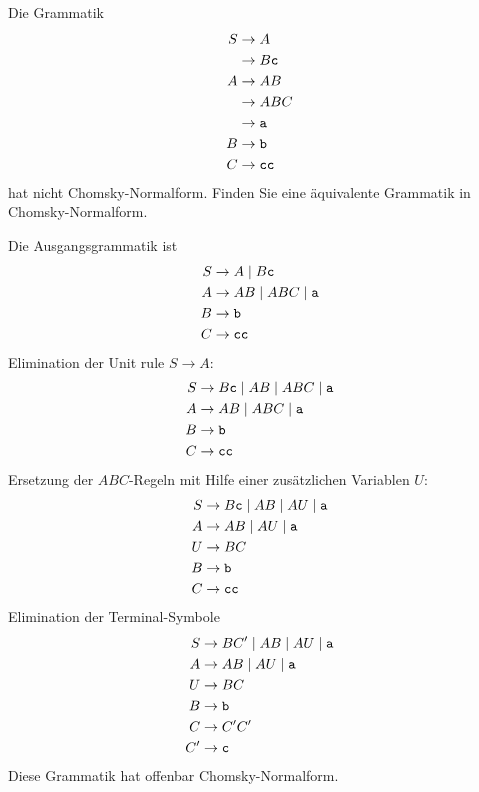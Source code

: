 Die Grammatik
\begin{align*}
S&\to A\\
 &\to B{\tt c}\\
A&\to AB\\
 &\to ABC\\
 &\to {\tt a}\\
B&\to {\tt b}\\
C&\to {\tt cc}
\end{align*}
hat nicht Chomsky-Normalform. Finden Sie eine äquivalente Grammatik
in Chomsky-Normalform.


\begin{loesung}
Die Ausgangsgrammatik ist
\begin{align*}
S&\to A\;|\;B{\tt c}\\
A&\to AB\;|\;ABC\;|\;{\tt a}\\
B&\to {\tt b}\\
C&\to {\tt cc}
\end{align*}
Elimination der Unit rule $S\to A$:
\begin{align*}
S&\to B{\tt c}\;|\;AB\;|\;ABC\;|\;{\tt a}\\
A&\to AB\;|\;ABC\;|\;{\tt a}\\
B&\to {\tt b}\\
C&\to {\tt cc}
\end{align*}
Ersetzung der $ABC$-Regeln mit Hilfe einer zusätzlichen
Variablen $U$:
\begin{align*}
S&\to B{\tt c}\;|\;AB\;|\;AU\;|\;{\tt a}\\
A&\to AB\;|\;AU\;|\;{\tt a}\\
U&\to BC\\
B&\to {\tt b}\\
C&\to {\tt cc}
\end{align*}
Elimination der Terminal-Symbole
\begin{align*}
S&\to BC'\;|\;AB\;|\;AU\;|\;{\tt a}\\
A&\to AB\;|\;AU\;|\;{\tt a}\\
U&\to BC\\
B&\to {\tt b}\\
C&\to C'C'\\
C'&\to {\tt c}
\end{align*}
Diese Grammatik hat offenbar Chomsky-Normalform.
\end{loesung}

